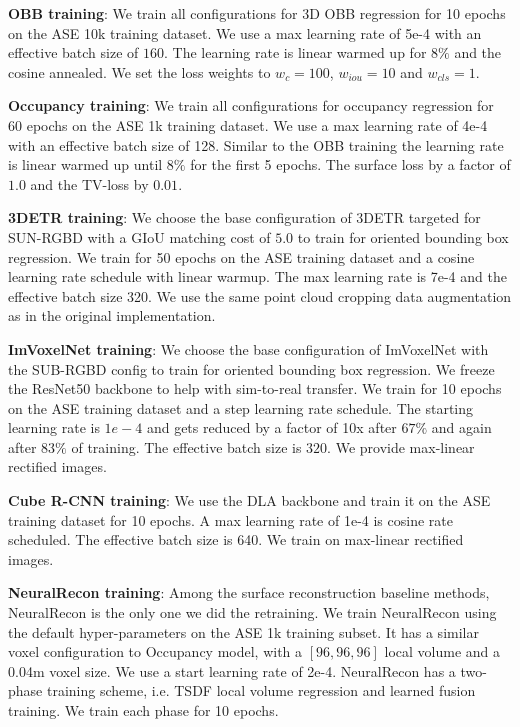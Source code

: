 \noindent\textbf{\EVL{} OBB training}: We train all configurations for 3D OBB regression for 10 epochs on the ASE 10k training dataset. We use a max learning rate of 5e-4 with an effective batch size of $160$. The learning rate is linear warmed up for $8\%$ and the cosine annealed. 
We set the loss weights to $w_c=100$, $w_{iou}=10$ and $w_{cls}=1$.

\noindent\textbf{\EVL{} Occupancy training}: We train all configurations for occupancy regression for 60 epochs on the ASE 1k training dataset. We use a max learning rate of 4e-4 with an effective batch size of 128. Similar to the OBB training the learning rate is linear warmed up until $8\%$ for the first 5 epochs. The surface loss by a factor of $1.0$ and the TV-loss by $0.01$.

\noindent\textbf{3DETR training}: We choose the base configuration of 3DETR targeted for SUN-RGBD with a GIoU matching cost of $5.0$ to train for oriented bounding box regression. We train for 50 epochs on the ASE training dataset and a cosine learning rate schedule with linear warmup. The max learning rate is 7e-4 and the effective batch size 320. We use the same point cloud cropping data augmentation as in the original implementation.

\noindent\textbf{ImVoxelNet training}: We choose the base configuration of ImVoxelNet with the SUB-RGBD config to train for oriented bounding box regression. We freeze the ResNet50 backbone to help with sim-to-real transfer. We train for 10 epochs on the ASE training dataset and a step learning rate schedule. The starting learning rate is $1e-4$ and gets reduced by a factor of 10x after $67\%$ and again after $83\%$ of training. The effective batch size is $320$. We provide max-linear rectified images.

\noindent\textbf{Cube R-CNN training}: We use the DLA backbone and train it on the ASE training dataset for 10 epochs. A max learning rate of 1e-4 is cosine rate scheduled. The effective batch size is 640. We train on max-linear rectified images.

\noindent\textbf{NeuralRecon training}: Among the surface reconstruction baseline methods, NeuralRecon is the only one we did the retraining. We train NeuralRecon using the default hyper-parameters on the ASE 1k training subset. It has a similar voxel configuration to \EVL{} Occupancy model, with a $[96, 96, 96]$ local volume and a 0.04m voxel size. We use a start learning rate of 2e-4. NeuralRecon has a two-phase training scheme, i.e. TSDF local volume regression and learned fusion training. We train each phase for 10 epochs.  

